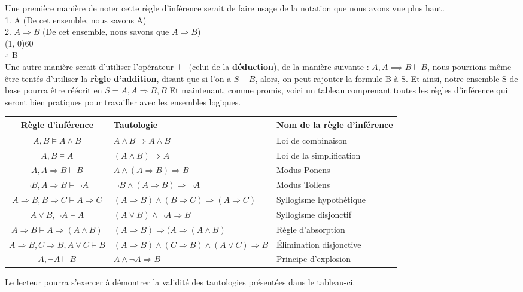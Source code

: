 \documentclass[a4paper, 12pt]{article}
\newcommand{\imply}{\Rightarrow}
\numberwithin{equation}{subsection}
\begin{document}
  Une première manière de noter cette règle d'inférence serait de faire usage de la notation que nous avons vue plus haut. \\[0.5cm]
    1. A (De cet ensemble, nous savons A) \\
    2. $A \imply B$ (De cet ensemble, nous savons que $A \imply B$) \\
  \hspace{10cm}\line(1, 0){60} \\
  $\therefore$ B \\[0.5cm]
  Une autre manière serait d'utiliser l'opérateur $\vDash$ (celui de la {\bf déduction}), de la manière suivante : $A, A \implies B \vDash B$, nous pourrions même être tentés d'utiliser la {\bf règle d'addition}, disant que si l'on a $S \vDash B$, alors, on peut rajouter la formule B à S. Et ainsi, notre ensemble S de base pourra être réécrit en $S = {A, A \imply B, B}$
  Et maintenant, comme promis, voici un tableau comprenant toutes les règles d'inférence qui seront bien pratiques pour travailler avec les ensembles logiques.
  \FloatBarrier
  \begin{adjustwidth}{300pt}{0pt}
    \begin{table}[H]
    \begin{tabular}{|c|M{5.0cm}|p{5.0cm}|}
      \hline Règle d'inférence & Tautologie & Nom de la règle d'inférence \\
      \hline $A, B \vDash A \land B$ & $A \land B \imply A \land B$& Loi de combinaison \\
      \hline $A, B \vDash A$ & $(A \land B) \imply A $& Loi de la simplification \\
      \hline $A, A \imply B \vDash B$ & $A \land (A \imply B) \imply B $ & Modus Ponens \\
      \hline $\neg B, A \imply B \vDash \neg A$ & $\neg B \land (A \imply B) \imply \neg A$ & Modus Tollens \\
      \hline $A \imply B, B \imply C \vDash A \imply C$ & $(A \imply B) \land (B \imply C) \imply (A \imply C)$ & Syllogisme hypothétique \\
      \hline $A \lor B, \neg A \vDash A$ & $(A \lor B) \land \neg A \imply B$ & Syllogisme disjonctif \\
      \hline $A \imply B \vDash A \imply (A \land B)$ & $(A \imply B) \imply (A \imply (A \land B)$ & Règle d'absorption \\
      \hline $A \imply B, C \imply B, A \lor C \vDash B$ & $(A \imply B) \land (C \imply B) \land (A \lor C) \imply B$ & Élimination disjonctive\\
      \hline $A, \neg A \vDash B$ & $A \land \neg A \imply B$ & Principe d'explosion \\
      \hline
    \end{tabular}
  \end{table}
\end{adjustwidth}
\FloatBarrier
Le lecteur pourra s'exercer à démontrer la validité des tautologies présentées dans le tableau-ci. \\
\end{document}
